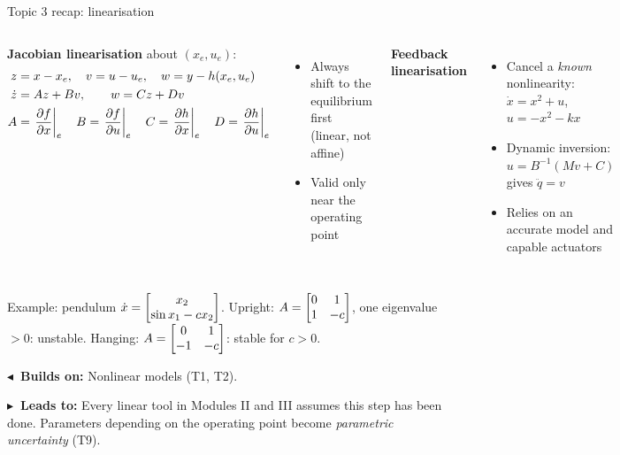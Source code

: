 \documentclass[10pt]{beamer-control}
\newcommand\LINKS[2]{%
  \par\vfill
  {\scriptsize\setlength\fboxsep{3pt}%
  \colorbox{AUHighlight!10}{\parbox{\dimexpr\linewidth-6pt\relax}{%
    \textbf{\color{AUHighlight}$\blacktriangleleft$~Builds on:} #1\par
    \textbf{\color{AUHighlight}$\blacktriangleright$~Leads to:} #2%
    \hfill\hyperlink{coursemap}{\beamerbutton{Course map}}}}}%
}
\begin{document}
\begin{frame}{Topic 3 recap: linearisation}
  \begin{columns}[t]
    \footnotesize
    \textbf{Jacobian linearisation} about $(x_e,u_e)$:
    \begin{align*}
      z &= x-x_e, \quad v = u-u_e, \quad w = y - h(x_e,u_e)\\
      \dot z &= Az + Bv, \qquad w = Cz + Dv\\
      A &= \left.\frac{\partial f}{\partial x}\right|_{e} \quad B = \left.\frac{\partial f}{\partial u}\right|_{e} \quad
      C = \left.\frac{\partial h}{\partial x}\right|_{e} \quad D = \left.\frac{\partial h}{\partial u}\right|_{e}
    \end{align*}
    \begin{itemize}
      \item Always shift to the equilibrium first (linear, not affine)
      \item Valid only near the operating point
    \end{itemize}
    \footnotesize
    \textbf{Feedback linearisation}
    \begin{itemize}
      \item Cancel a \emph{known} nonlinearity: $\dot x = x^2+u$, $u = -x^2-kx$
      \item Dynamic inversion: $u = B^{-1}(Mv + C)$ gives $\ddot q = v$
      \item Relies on an accurate model and capable actuators
    \end{itemize}
  \end{columns}
  \bigskip
  \footnotesize
  Example: pendulum $\dot x = \begin{bmatrix}x_2\\ \sin x_1 - cx_2\end{bmatrix}$. Upright: $A=\begin{bmatrix}0&1\\1&-c\end{bmatrix}$, one eigenvalue $>0$: \alert{unstable}. Hanging: $A=\begin{bmatrix}0&1\\-1&-c\end{bmatrix}$: stable for $c>0$.
  \LINKS{Nonlinear models (T1, T2).}{Every linear tool in Modules II and III assumes this step has been done. Parameters depending on the operating point become \emph{parametric uncertainty} (T9).}
\end{frame}
\end{document}

